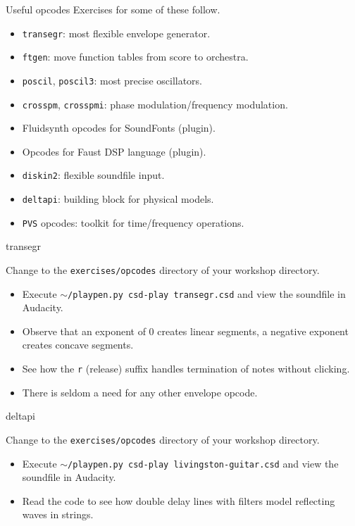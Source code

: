\documentclass{beamer}
\begin{document}
\begin{frame}{Useful opcodes}
Exercises for some of these follow.
\begin{itemize}
\item \texttt{transegr}: most flexible envelope generator.
\item \texttt{ftgen}: move function tables from score to orchestra.
\item \texttt{poscil}, \texttt{poscil3}: most precise oscillators.
\item \texttt{crosspm}, \texttt{crosspmi}: phase modulation/frequency modulation.
\item Fluidsynth opcodes for SoundFonts (plugin).
\item Opcodes for Faust DSP language (plugin).
\item \texttt{diskin2}: flexible soundfile input.
\item \texttt{deltapi}: building block for physical models.
\item \texttt{PVS} opcodes: toolkit for time/frequency operations.
\end{itemize}
\end{frame}

\begin{frame}{transegr}
\begin{example}
Change to the \texttt{exercises/opcodes} directory of your workshop directory.
\begin{itemize}
\item Execute \texttt{$\sim$/playpen.py csd-play transegr.csd} and view the soundfile in Audacity.
\end{itemize}
\end{example}
\begin{itemize}
\item Observe that an exponent of 0 creates linear segments, a negative exponent creates concave segments.
\item See how the \texttt{r} (release) suffix handles termination of notes without clicking.
\item There is seldom a need for any other envelope opcode.
\end{itemize}
\end{frame}

\begin{frame}{deltapi}
\begin{example}
Change to the \texttt{exercises/opcodes} directory of your workshop directory.
\begin{itemize}
\item Execute \texttt{$\sim$/playpen.py csd-play livingston-guitar.csd} and view the soundfile in Audacity.
\item Read the code to see how double delay lines with filters model reflecting waves in strings.
\end{itemize}
\end{example}
\end{frame}
\end{document}
